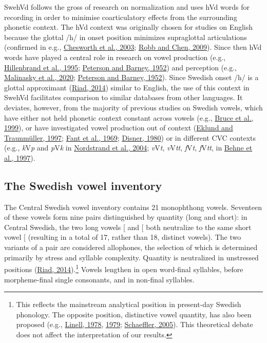 \documentclass[utf8]{frontiersSCNS}
\begin{document}
SwehVd follows the gross of research on normalization and uses hVd words for recording in order to minimise coarticulatory effects from the surrounding phonetic context. The hVd context was originally chosen for studies on English because the glottal /h/ in onset position minimizes supraglottal articulations (confirmed in e.g., \protect\hyperlink{ref-chesworth2003}{Chesworth et al., 2003}; \protect\hyperlink{ref-robb2009}{Robb and Chen, 2009}). Since then hVd words have played a central role in research on vowel production (e.g., \protect\hyperlink{ref-hillenbrand1995}{Hillenbrand et al., 1995}; \protect\hyperlink{ref-Peterson1952}{Peterson and Barney, 1952}) and perception (e.g., \protect\hyperlink{ref-malinasky2020}{Malinasky et al., 2020}; \protect\hyperlink{ref-Peterson1952}{Peterson and Barney, 1952}). Since Swedish onset /h/ is a glottal approximant (\protect\hyperlink{ref-riad2014}{Riad, 2014}) similar to English, the use of this context in SwehVd facilitates comparison to similar databases from other languages. It deviates, however, from the majority of previous studies on Swedish vowels, which have either not held phonetic context constant across vowels (e.g., \protect\hyperlink{ref-bruce1999}{Bruce et al., 1999}), or have investigated vowel production out of context (\protect\hyperlink{ref-eklund1997}{Eklund and Traunmüller, 1997}; \protect\hyperlink{ref-fant1969}{Fant et al., 1969}; \protect\hyperlink{ref-disner1980}{Disner, 1980}) or in different CVC contexts (e.g., \emph{k}V\emph{p} and \emph{p}V\emph{k} in \protect\hyperlink{ref-nordstrand2004}{Nordstrand et al., 2004}; \emph{v}V\emph{t}, \emph{v}V\emph{tt}, \emph{f}V\emph{t}, \emph{f}V\emph{tt}, in \protect\hyperlink{ref-behne1997}{Behne et al., 1997}).

\hypertarget{sec:sweVowelinventory}{%
\subsection*{The Swedish vowel inventory}\label{sec:sweVowelinventory}}

The Central Swedish vowel inventory contains 21 monophthong vowels. Seventeen of these vowels form nine pairs distinguished by quantity (long and short): in Central Swedish, the two long vowels {[}\ipatext{ɛː}{]} and {[}\ipatext{eː}{]} both neutralize to the same short vowel {[}\ipatext{ɛ}{]} (resulting in a total of 17, rather than 18, distinct vowels). The two variants of a pair are considered allophones, the selection of which is determined primarily by stress and syllable complexity. Quantity is neutralized in unstressed positions (\protect\hyperlink{ref-riad2014}{Riad, 2014}).\footnote{This reflects the mainstream analytical position in present-day Swedish phonology. The opposite position, distinctive vowel quantity, has also been proposed (e.g., \protect\hyperlink{ref-linell1978}{Linell, 1978}, \protect\hyperlink{ref-linell1979}{1979}; \protect\hyperlink{ref-schaeffler2005a}{Schaeffler, 2005}). This theoretical debate does not affect the interpretation of our results.} Vowels lengthen in open word-final syllables, before morpheme-final single consonants, and in non-final syllables.
\end{document}
